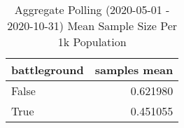 \begin{table}
\centering
\caption{Aggregate Polling (2020-05-01 - 2020-10-31) Mean Sample Size Per 1k Population}
\label{table:aggregate\_polling\_2020-05-01\_-\_2020-10-31\_mean\_sample\_size\_per\_1k\_population}
\begin{tabular}{lr}
\toprule
 battleground &  samples mean \\
\midrule
        False &      0.621980 \\
         True &      0.451055 \\
\bottomrule
\end{tabular}
\end{table}
